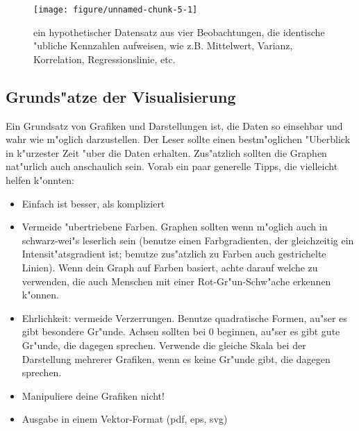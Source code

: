 \documentclass[a4paper,twoside]{tufte-book}\usepackage[]{graphicx}\usepackage[]{color}
\makeatletter
\def\maxwidth{ %
  \ifdim\Gin@nat@width>\linewidth
    \linewidth
  \else
    \Gin@nat@width
  \fi
}
\makeatother
\begin{document}
\begin{figure}[htbp]
\begin{center}
\begin{Schunk}

\texttt{[image: figure/unnamed-chunk-5-1]} \end{Schunk}
\caption{ein hypothetischer Datensatz aus vier Beobachtungen, die identische "ubliche Kennzahlen aufweisen, wie z.B. Mittelwert, Varianz, Korrelation, Regressionslinie, etc.}
\label{fig: Anscombes Quartet}
\end{center}
\end{figure}


\subsection{Grunds"atze der Visualisierung}

Ein Grundsatz von Grafiken und Darstellungen ist, die Daten so einsehbar und wahr wie m"oglich darzustellen. Der Leser sollte einen bestm"oglichen "Uberblick in k"urzester Zeit "uber die Daten erhalten. Zus"atzlich sollten die Graphen nat"urlich auch anschaulich sein. Vorab ein paar generelle Tipps, die vielleicht helfen k"onnten:

\begin{itemize}
\item Einfach ist besser, als kompliziert
\item Vermeide "ubertriebene Farben. Graphen sollten wenn m"oglich auch in schwarz-wei"s leserlich sein (benutze einen Farbgradienten, der gleichzeitig ein Intensit"atsgradient ist; benutze zus"atzlich zu Farben auch gestrichelte Linien). Wenn dein Graph auf Farben basiert, achte darauf welche zu verwenden, die auch Menschen mit einer Rot-Gr"un-Schw"ache erkennen k"onnen.
\item Ehrlichkeit: vermeide Verzerrungen. Benutze quadratische Formen, au"ser es gibt besondere Gr"unde. Achsen sollten bei 0 beginnen, au"ser es gibt gute Gr"unde, die dagegen sprechen. Verwende die gleiche Skala bei der Darstellung mehrerer Grafiken, wenn es keine Gr"unde gibt, die dagegen sprechen. 
\item Manipuliere deine Grafiken nicht!
\item Ausgabe in einem Vektor-Format (pdf, eps, svg)
\end{itemize}
\end{document}
